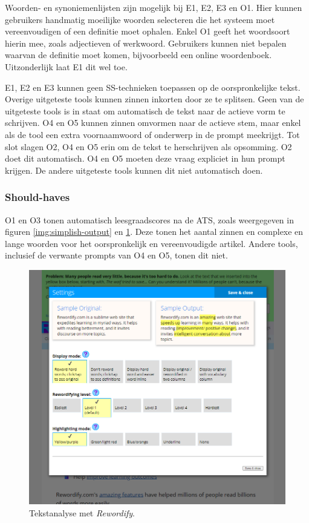 Woorden- en synoniemenlijsten zijn mogelijk bij E1, E2, E3 en O1. Hier kunnen gebruikers handmatig moeilijke woorden selecteren die het systeem moet vereenvoudigen of een definitie moet ophalen. Enkel O1 geeft het woordsoort hierin mee, zoals adjectieven of werkwoord. Gebruikers kunnen niet bepalen waarvan de definitie moet komen, bijvoorbeeld een online woordenboek. Uitzonderlijk laat E1 dit wel toe.

\medspace

E1, E2 en E3 kunnen geen SS-technieken toepassen op de oorspronkelijke tekst. Overige uitgeteste tools kunnen zinnen inkorten door ze te splitsen. Geen van de uitgeteste tools is in staat om automatisch de tekst naar de actieve vorm te schrijven. O4 en O5 kunnen zinnen omvormen naar de actieve stem, maar enkel als de tool een extra voornaamwoord of onderwerp in de prompt meekrijgt. Tot slot slagen O2, O4 en O5 erin om de tekst te herschrijven als opsomming. O2 doet dit automatisch. O4 en O5 moeten deze vraag expliciet in hun prompt krijgen. De andere uitgeteste tools kunnen dit niet automatisch doen. 

\subsubsection{Should-haves}

O1 en O3 tonen automatisch leesgraadscores na de ATS, zoals weergegeven in figuren \ref{img:simplish-output} en \ref{img:scholarcy}. Deze tonen het aantal zinnen en complexe en lange woorden voor het oorspronkelijk en vereenvoudigde artikel. Andere tools, inclusief de verwante prompts van O4 en O5, tonen dit niet.

\begin{figure}[H]
	\includegraphics[width=\linewidth]{img/scholarcy-attempt.png}
	\caption{Tekstanalyse met \textit{Rewordify}.}
	\label{img:scholarcy}
\end{figure}

